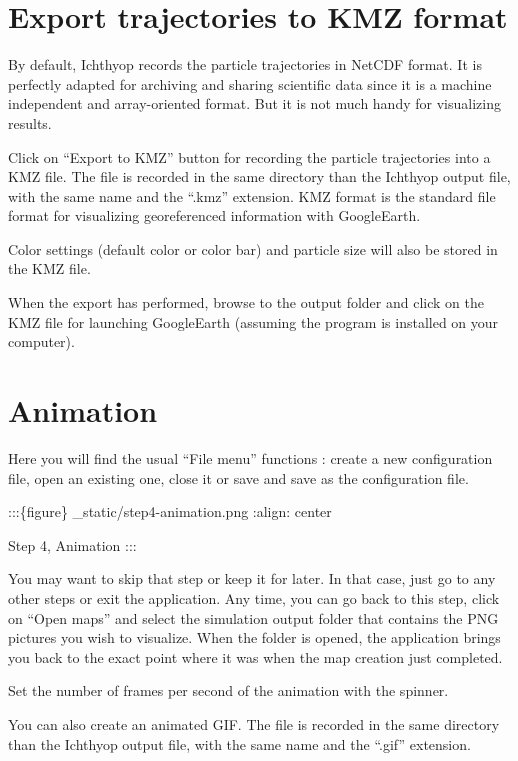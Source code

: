 \documentclass[
  letterpaper,
  DIV=11,
  numbers=noendperiod]{scrreprt}
\begin{document}
\section{Export trajectories to KMZ
format}\label{export-trajectories-to-kmz-format}

By default, Ichthyop records the particle trajectories in NetCDF format.
It is perfectly adapted for archiving and sharing scientific data since
it is a machine independent and array-oriented format. But it is not
much handy for visualizing results.

Click on ``Export to KMZ'' button for recording the particle
trajectories into a KMZ file. The file is recorded in the same directory
than the Ichthyop output file, with the same name and the ``.kmz''
extension. KMZ format is the standard file format for visualizing
georeferenced information with GoogleEarth.

Color settings (default color or color bar) and particle size will also
be stored in the KMZ file.

When the export has performed, browse to the output folder and click on
the KMZ file for launching GoogleEarth (assuming the program is
installed on your computer).

\section{Animation}\label{animation}

Here you will find the usual ``File menu'' functions : create a new
configuration file, open an existing one, close it or save and save as
the configuration file.

:::\{figure\} \_static/step4-animation.png :align: center

Step 4, Animation :::

You may want to skip that step or keep it for later. In that case, just
go to any other steps or exit the application. Any time, you can go back
to this step, click on ``Open maps'' and select the simulation output
folder that contains the PNG pictures you wish to visualize. When the
folder is opened, the application brings you back to the exact point
where it was when the map creation just completed.

Set the number of frames per second of the animation with the spinner.

You can also create an animated GIF. The file is recorded in the same
directory than the Ichthyop output file, with the same name and the
``.gif'' extension.
\end{document}
